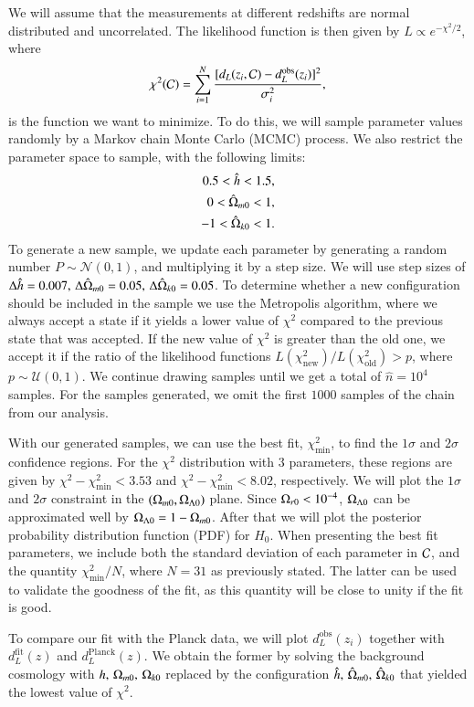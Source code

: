 We will assume that the measurements at different redshifts are normal distributed and uncorrelated. The likelihood function is then given by $L\propto e^{-\chi^2/2}$, where 
\begin{equation}
    \chi^2(\mathcal{C}) = \sum_{i=1}^N \frac{[d_L(z_i, \mathcal{C}) - d_L^\mathrm{obs}(z_i)]^2}{\sigma_i^2}, \label{eq:M1:implementations:chi2_supernova_data}
\end{equation}
is the function we want to minimize. To do this, we will sample parameter values randomly by a Markov chain Monte Carlo (MCMC) process. We also restrict the parameter space to sample, with the following limits:     
\begin{equation} \label{eq:M1:implementations:supernova_parameter_ranges}
    \begin{split}
        0.5 < \hat{h} < 1.5, \\
        0 < \hat{\Omega}_{m0} < 1, \\
        -1 < \hat{\Omega}_{k0} < 1.
    \end{split}
\end{equation}   
To generate a new sample, we update each parameter by generating a random number $P\sim\mathcal{N}(0,1)$, and multiplying it by a step size. We will use step sizes of $\Delta \hat{h} = 0.007,\,\Delta \hat{\Omega}_{m0}=0.05,\,\Delta\hat{\Omega}_{k0}=0.05$. To determine whether a new configuration should be included in the sample we use the Metropolis algorithm, where we always accept a state if it yields a lower value of $\chi^2$ compared to the previous state that was accepted. If the new value of $\chi^2$ is greater than the old one, we accept it if the ratio of the likelihood functions $L(\chi^2_\mathrm{new})/L(\chi^2_\mathrm{old})>p$, where $p\sim\mathcal{U}(0,1)$. We continue drawing samples until we get a total of $\hat{n}=10^4$ samples. For the samples generated, we omit the first $1000$ samples of the chain from our analysis. 

With our generated samples, we can use the best fit, $\chi^2_\mathrm{min}$, to find the $1\sigma$ and $2\sigma$ confidence regions. For the $\chi^2$ distribution with $3$ parameters, these regions are given by $\chi^2 - \chi^2_\mathrm{min}<3.53$ and $\chi^2 - \chi^2_\mathrm{min}<8.02$, respectively. We will plot the $1\sigma$ and $2\sigma$ constraint in the $(\Omega_{m0},\Omega_{\Lambda 0})$ plane. Since $\Omega_{r0}<10^{-4}$, $\Omega_{\Lambda 0}$ can be approximated well by $\Omega_{\Lambda 0}=1-\Omega_{m0}$. After that we will plot the posterior probability distribution function (PDF) for $H_0$. When presenting the best fit parameters, we include both the standard deviation of each parameter in $\mathcal{C}$, and the quantity $\chi_\mathrm{min}^2/N$, where $N=31$ as previously stated. The latter can be used to validate the goodness of the fit, as this quantity will be close to unity if the fit is good. 

To compare our fit with the Planck data, we will plot $d_L^\mathrm{obs}(z_i)$ together with $d_L^\mathrm{fit}(z)$ and $d_L^\mathrm{Planck}(z)$. We obtain the former by solving the background cosmology with $h,\,\Omega_{m0},\,\Omega_{k0}$ replaced by the configuration $\hat{h},\,\hat{\Omega}_{m0},\,\hat{\Omega}_{k0}$ that yielded the lowest value of $\chi^2$.     



